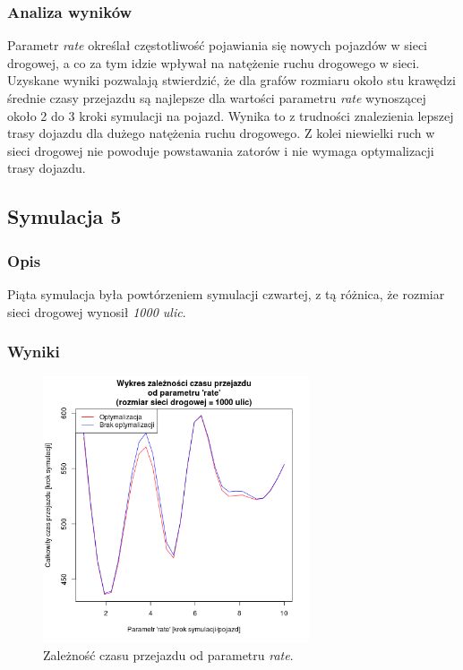 \documentclass[11pt,a4paper]{article}
\begin{document}
\subsubsection{Analiza wyników}

Parametr \textit{rate} określał częstotliwość pojawiania się nowych pojazdów w sieci drogowej, a co za tym idzie wpływał na natężenie ruchu drogowego w sieci. Uzyskane wyniki pozwalają stwierdzić, że dla grafów rozmiaru około stu krawędzi średnie czasy przejazdu są najlepsze dla wartości parametru \textit{rate} wynoszącej około 2 do 3 kroki symulacji na pojazd. Wynika to z trudności znalezienia lepszej trasy dojazdu dla dużego natężenia ruchu drogowego. Z kolei niewielki ruch w sieci drogowej nie powoduje powstawania zatorów i nie wymaga optymalizacji trasy dojazdu.

\subsection{Symulacja 5}

\subsubsection{Opis}

Piąta symulacja była powtórzeniem symulacji czwartej, z tą różnica, że rozmiar sieci drogowej wynosił \textit{1000 ulic}.

\subsubsection{Wyniki}



\begin{figure}[H]
	\centering
		\includegraphics[width=0.7\textwidth]{../images/simulation5}
	\caption{Zależność czasu przejazdu od parametru \textit{rate}.}
\end{figure}
\end{document}
